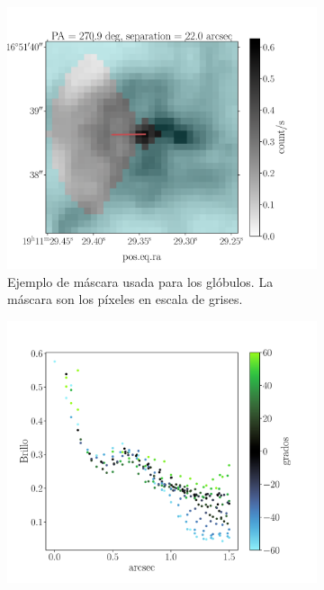 \documentclass{book}
\begin{document}
\begin{figure}[htb]
  \begin{subfigure}[b]{0.5\textwidth}
    \includegraphics[width=\textwidth, height=0.9\textwidth]{Nuevas imagenes finales/F_4_1_A.pdf}
    \caption{Ejemplo de máscara usada para los glóbulos. La máscara
      son los píxeles en escala de grises.}
    \label{fig:f1}
  \end{subfigure}
  \hfill
  \begin{subfigure}[b]{0.5\textwidth}
    \includegraphics[width=\textwidth, height=0.9\textwidth]{Nuevas imagenes finales/F_4_1_B.pdf}

\end{subfigure}
\end{figure}
\end{document}
